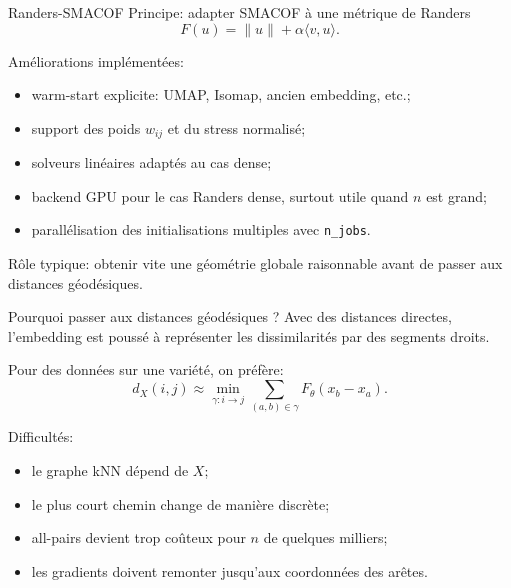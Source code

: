 \documentclass[aspectratio=169]{beamer}
\newcommand{\Fmetric}{F_\theta}
\begin{document}
\begin{frame}{Randers-SMACOF}
  Principe: adapter SMACOF à une métrique de Randers
  \[
    F(u)=\|u\|+\alpha \langle v,u\rangle .
  \]

  \vspace{0.3cm}
  Améliorations implémentées:
  \begin{itemize}
    \item warm-start explicite: UMAP, Isomap, ancien embedding, etc.;
    \item support des poids $w_{ij}$ et du stress normalisé;
    \item solveurs linéaires adaptés au cas dense;
    \item backend GPU pour le cas Randers dense, surtout utile quand $n$ est grand;
    \item parallélisation des initialisations multiples avec \texttt{n\_jobs}.
  \end{itemize}

  \vspace{0.2cm}
  Rôle typique: obtenir vite une géométrie globale raisonnable avant de passer
  aux distances géodésiques.
\end{frame}

\begin{frame}{Pourquoi passer aux distances géodésiques ?}
  Avec des distances directes, l'embedding est poussé à représenter les
  dissimilarités par des segments droits.

  \vspace{0.3cm}
  Pour des données sur une variété, on préfère:
  \[
    d_X(i,j)
    \approx
    \min_{\gamma:i\to j}
    \sum_{(a,b)\in \gamma}
    \Fmetric(x_b-x_a).
  \]

  \vspace{0.2cm}
  Difficultés:
  \begin{itemize}
    \item le graphe kNN dépend de $X$;
    \item le plus court chemin change de manière discrète;
    \item all-pairs devient trop coûteux pour $n$ de quelques milliers;
    \item les gradients doivent remonter jusqu'aux coordonnées des arêtes.
  \end{itemize}
\end{frame}
\end{document}
